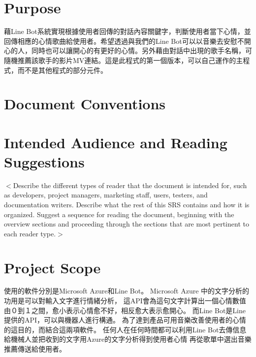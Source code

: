 \documentclass{scrreprt}
\begin{document}
\section{Purpose}
\begin{CJK}{UTF8}{<font>}
        藉Line Bot系統實現根據使用者回傳的對話內容關鍵字，判斷使用者當下心情，並回傳相應的心情歌曲給使用者。希望透過與我們的Line Bot可以以音樂去安慰不開心的人，同時也可以讓開心的有更好的心情。另外藉由對話中出現的歌手名稱，可隨機推薦該歌手的影片MV連結。這是此程式的第一個版本，可以自己運作的主程式，而不是其他程式的部分元件。
\end{CJK}

\section{Document Conventions}
\begin{CJK}{UTF8}{<font>
        本文以黑色粗體字表示多個大小標題來做強調。
\end{CJK}

\section{Intended Audience and Reading Suggestions}
\begin{CJK}{UTF8}{<font>}
       $<$Describe the different types of reader that the document is intended for, 
such as developers, project managers, marketing staff, users, testers, and 
documentation writers. Describe what the rest of this SRS contains and how it is 
organized. Suggest a sequence for reading the document, beginning with the 
overview sections and proceeding through the sections that are most pertinent to 
each reader type.$>$
\end{CJK}

\section{Project Scope}
\begin{CJK}{UTF8}{<font>}
        使用的軟件分別是Microsoft Azure和Line Bot。
Microsoft Azure 中的文字分析的功用是可以對輸入文字進行情緒分析，
這API會為這句文字計算出一個心情數值由０到１之間，愈小表示心情愈不好，相反愈大表示愈開心。
而Line Bot是Line提供的API，可以與機器人進行構通。
為了達到產品可用音樂改善使用者的心情的這目的，而結合這兩項軟件。
任何人在任何時間都可以利用Line Bot去傳信息給機械人並把收到的文字用Azure的文字分析得到使用者心情
再從歌單中選出音樂推薦傳送給使用者。
\end{CJK}
\end{document}
